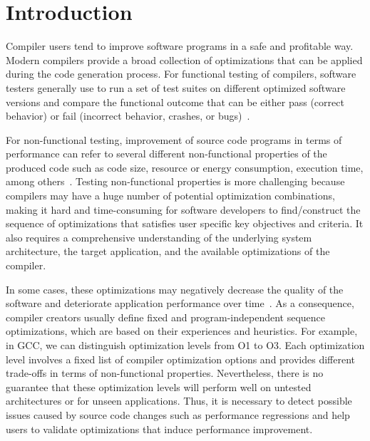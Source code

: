 \section{Introduction}
Compiler users tend to improve software programs in a safe and profitable way. Modern compilers provide a broad collection of optimizations that can be applied during the code generation process. 
For functional testing of compilers, software testers generally use to run a set of test suites on different optimized software versions and compare the functional outcome that can be either pass (correct behavior) or fail (incorrect behavior, crashes, or bugs)~\cite{chen2016empirical,hoste2008cole,le2014compiler}.

For non-functional testing, improvement of source code programs in terms of performance can refer to several different non-functional properties of the produced code such as code size, resource or energy consumption, execution time, among others~\cite{almagor2004finding,pan2006fast}.
Testing non-functional properties is more challenging because compilers may have a huge number of potential optimization combinations, making it hard and time-consuming for software developers to find/construct the sequence of optimizations that satisfies user specific key objectives and criteria. It also requires a comprehensive understanding of the underlying system architecture, the target application, and the available optimizations of the compiler.

In some cases, these optimizations may negatively decrease the quality of the software and deteriorate application performance over time~\cite{molyneaux2009art}. 
As a consequence, compiler creators usually define fixed and program-independent sequence optimizations, which are based on their experiences and heuristics. For example, in GCC, we can distinguish optimization levels from O1 to O3. Each optimization level involves a fixed list of compiler optimization options and provides different trade-offs in terms of non-functional properties.
Nevertheless, there is no guarantee that these optimization levels will perform well on untested architectures or for unseen applications. 
Thus, it is necessary to detect possible issues caused by source code changes such as performance regressions and help users to validate optimizations that induce performance improvement.

